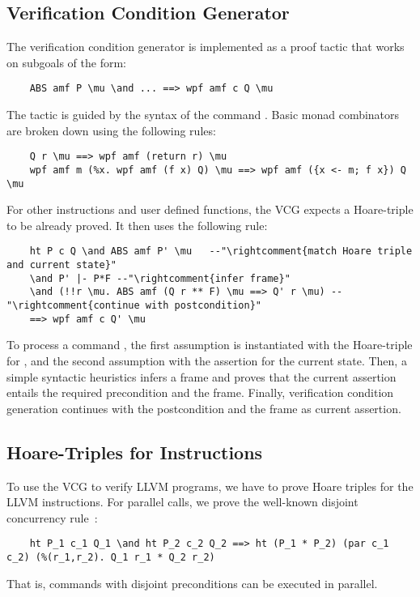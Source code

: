 \documentclass[a4paper,UKenglish,cleveref, autoref, thm-restate]{lipics-v2021}
\begin{document}
  \subsection{Verification Condition Generator}
  The verification condition generator is implemented as a proof tactic that works on subgoals of the form:
  \begin{lstlisting}
    ABS amf P \mu \and ... ==> wpf amf c Q \mu
  \end{lstlisting}
  The tactic is guided by the syntax of the command .
  Basic monad combinators are broken down using the following rules:
  \begin{lstlisting}
    Q r \mu ==> wpf amf (return r) \mu
    wpf amf m (%x. wpf amf (f x) Q) \mu ==> wpf amf ({x <- m; f x}) Q \mu
  \end{lstlisting}
  For other instructions and user defined functions, the VCG expects a Hoare-triple to be already proved.
  It then uses the following rule:
  \begin{lstlisting}
    ht P c Q \and ABS amf P' \mu   --"\rightcomment{match Hoare triple and current state}"
    \and P' |- P*F --"\rightcomment{infer frame}"
    \and (!!r \mu. ABS amf (Q r ** F) \mu ==> Q' r \mu) --"\rightcomment{continue with postcondition}"
    ==> wpf amf c Q' \mu
  \end{lstlisting}
  To process a command , the first assumption is instantiated with the Hoare-triple for ,
  and the second assumption with the assertion  for the current state.
  Then, a simple syntactic heuristics infers a frame  and proves that the
  current assertion  entails the required precondition  and the frame.
  Finally, verification condition generation continues with the postcondition  and the frame as current assertion.


  \subsection{Hoare-Triples for Instructions}
  To use the VCG to verify LLVM programs, we have to prove Hoare triples for the LLVM instructions.
  For parallel calls, we prove the well-known disjoint concurrency rule~\cite{OH04}:
  \begin{lstlisting}
    ht P_1 c_1 Q_1 \and ht P_2 c_2 Q_2 ==> ht (P_1 * P_2) (par c_1 c_2) (%(r_1,r_2). Q_1 r_1 * Q_2 r_2)
  \end{lstlisting}
  That is, commands with disjoint preconditions can be executed in parallel.
\end{document}
